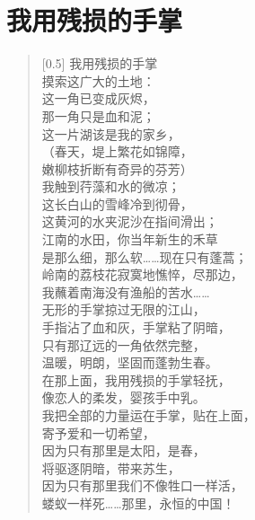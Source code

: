 \documentclass[12pt,UTF-8,openany]{ctexbook}
\begin{document}
\chapter{我用残损的手掌}

\begin{normalsize}
    
    \begin{verse}[0.5\linewidth]
        我用残损的手掌 \\
        摸索这广大的土地： \\
        这一角已变成灰烬， \\
        那一角只是血和泥； \\
        这一片湖该是我的家乡， \\
        （春天，堤上繁花如锦障， \\
        嫩柳枝折断有奇异的芬芳） \\
        我触到荇藻和水的微凉； \\
        这长白山的雪峰冷到彻骨， \\
        这黄河的水夹泥沙在指间滑出； \\
        江南的水田，你当年新生的禾草 \\
        是那么细，那么软……现在只有蓬蒿； \\
        岭南的荔枝花寂寞地憔悴，尽那边， \\
        我蘸着南海没有渔船的苦水…… \\
        无形的手掌掠过无限的江山， \\
        手指沾了血和灰，手掌粘了阴暗， \\
        只有那辽远的一角依然完整， \\
        温暖，明朗，坚固而蓬勃生春。 \\
        在那上面，我用残损的手掌轻抚， \\
        像恋人的柔发，婴孩手中乳。 \\
        我把全部的力量运在手掌，贴在上面， \\
        寄予爱和一切希望， \\
        因为只有那里是太阳，是春， \\
        将驱逐阴暗，带来苏生， \\
        因为只有那里我们不像牲口一样活， \\
        蝼蚁一样死……那里，永恒的中国！
    \end{verse}
    
\end{normalsize}
\end{document}
